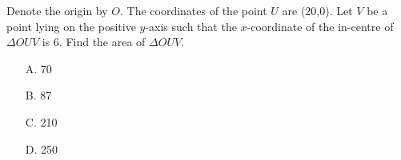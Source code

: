 
Denote the origin by $O$. The coordinates of the point $U$ are (20,0). Let $V$ be a point lying on the positive $y$-axis such that the $x$-coordinate of the in-centre of $\Delta OUV$ is 6. Find the area of $\Delta OUV$.
    \begin{itemize}
        \item[A.] 70
        \item[B.] 87
        \item[C.] 210
        \item[D.] 250
    \end{itemize}


